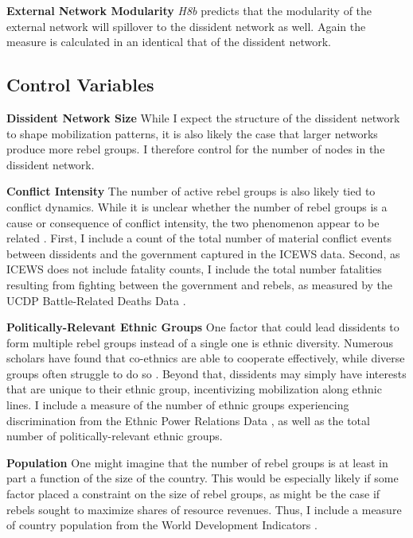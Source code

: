 \textbf{External Network Modularity} \textit{H8b} predicts that the modularity of the external network will spillover to the dissident network as well. Again the measure is calculated in an identical that of the dissident network.

\subsection{Control Variables}

\textbf{Dissident Network Size} While I expect the structure of the dissident network to shape mobilization patterns, it is also likely the case that larger networks produce more rebel groups. I therefore control for the number of nodes in the dissident network.

\textbf{Conflict Intensity} The number of active rebel groups is also likely tied to conflict dynamics. While it is unclear whether the number of rebel groups is a cause or consequence of conflict intensity, the two phenomenon appear to be related \citep{Akcinaroglu2012a}. First, I include a count of the total number of material conflict events between dissidents and the government captured in the ICEWS data. Second, as ICEWS does not include fatality counts, I include the total number fatalities resulting from fighting between the government and rebels, as measured by the UCDP Battle-Related Deaths Data \citep{Sundberg2008a}.

\textbf{Politically-Relevant Ethnic Groups} One factor that could lead dissidents to form multiple rebel groups instead of a single one is ethnic diversity. Numerous scholars have found that co-ethnics are able to cooperate effectively, while diverse groups often struggle to do so \citep[e.g.][]{Habyarimana2012}. Beyond that, dissidents may simply have interests that are unique to their ethnic group, incentivizing mobilization along ethnic lines. I include a measure of the number of ethnic groups experiencing discrimination from the Ethnic Power Relations Data \citep{Vogt2015}, as well as the total number of politically-relevant ethnic groups.

\textbf{Population} One might imagine that the number of rebel groups is at least in part a function of the size of the country. This would be especially likely if some factor placed a constraint on the size of rebel groups, as might be the case if rebels sought to maximize shares of resource revenues. Thus, I include a measure of country population from the World Development Indicators \citep{Bank2015}.

